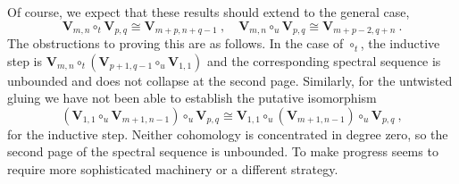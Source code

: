\documentclass[a4paper]{article}
\def\V{\mathbf{V}}
\begin{document}
Of course, we expect that these results should extend to the general case,
\begin{equation}
	\V_{m,n}\circ_t \V_{p,q} \cong \V_{m+p,n+q-1}~, \quad \V_{m,n}\circ_u \V_{p,q} \cong \V_{m+p-2,q+n}~.
\end{equation}
The obstructions to proving this are as follows. In the case of $\circ_t$, the inductive step is $\V_{m,n}\circ_t(\V_{p+1,q-1}\circ_u \V_{1,1})$ and the corresponding spectral sequence is unbounded and does not collapse at the second page. Similarly, for the untwisted gluing we have not been able to establish the putative isomorphism
\begin{equation}
	(\V_{1,1}\circ_u\V_{m+1,n-1})\circ_u\V_{p,q}\cong \V_{1,1}\circ_u(\V_{m+1,n-1})\circ_u\V_{p,q}~,
\end{equation}
for the inductive step. Neither cohomology is concentrated in degree zero, so the second page of the spectral sequence is unbounded. To make progress seems to require more sophisticated machinery or a different strategy.
\end{document}
